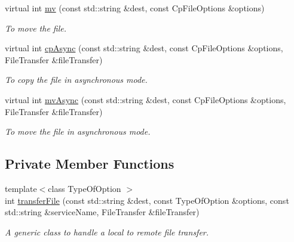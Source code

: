 \begin{DoxyCompactItemize}
virtual int \hyperlink{classRemoteFileProxy_ad8e194507f9506d72932cd25d27b673b}{mv} (const std::string \&dest, const CpFileOptions \&options)
\begin{DoxyCompactList}\small\item\em To move the file. \item\end{DoxyCompactList}\item 
virtual int \hyperlink{classRemoteFileProxy_a28406e593498d4cf3fd525de930410a2}{cpAsync} (const std::string \&dest, const CpFileOptions \&options, FileTransfer \&fileTransfer)
\begin{DoxyCompactList}\small\item\em To copy the file in asynchronous mode. \item\end{DoxyCompactList}\item 
virtual int \hyperlink{classRemoteFileProxy_ace1b3e6ecdd19b1da0e8074ae3034f89}{mvAsync} (const std::string \&dest, const CpFileOptions \&options, FileTransfer \&fileTransfer)
\begin{DoxyCompactList}\small\item\em To move the file in asynchronous mode. \item\end{DoxyCompactList}\end{DoxyCompactItemize}
\subsection*{Private Member Functions}
\begin{DoxyCompactItemize}
\item 
{\footnotesize template$<$class TypeOfOption $>$ }\\int \hyperlink{classRemoteFileProxy_ad0032944be978d1878dd79ec307cd977}{transferFile} (const std::string \&dest, const TypeOfOption \&options, const std::string \&serviceName, FileTransfer \&fileTransfer)
\begin{DoxyCompactList}\small\item\em A generic class to handle a local to remote file transfer. \item\end{DoxyCompactList}\end{DoxyCompactItemize}

